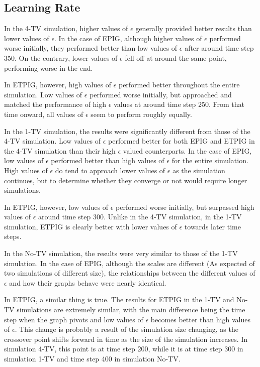 \documentclass[12pt]{thesis}
\begin{document}
\subsection{Learning Rate}
In the 4-TV simulation, higher values of $\epsilon$ generally provided better results than lower values of $\epsilon$. In the case of EPIG, although higher values of $\epsilon$ performed worse initially, they performed better than low values of $\epsilon$ after around time step 350. On the contrary, lower values of $\epsilon$ fell off at around the same point, performing worse in the end.

In ETPIG, however, high values of $\epsilon$ performed better throughout the entire simulation. Low values of $\epsilon$ performed worse initially, but approached and matched the performance of high $\epsilon$ values at around time step 250. From that time onward, all values of $\epsilon$ seem to perform roughly equally.

In the 1-TV simulation, the results were significantly different from those of the 4-TV simulation. Low values of $\epsilon$ performed better for both EPIG and ETPIG in the 4-TV simulation than their high $\epsilon$ valued counterparts. In the case of EPIG, low values of $\epsilon$ performed better than high values of $\epsilon$ for the entire simulation. High values of $\epsilon$ do tend to approach lower values of $\epsilon$ as the simulation continues, but to determine whether they converge or not would require longer simulations.

In ETPIG, however, low values of $\epsilon$ performed worse initially, but surpassed high values of $\epsilon$ around time step 300. Unlike in the 4-TV simulation, in the 1-TV simulation, ETPIG is clearly better with lower values of $\epsilon$ towards later time steps.

In the No-TV simulation, the results were very similar to those of the 1-TV simulation. In the case of EPIG, although the scales are different (As expected of two simulations of different size), the relationships between the different values of $\epsilon$ and how their graphs behave were nearly identical.

In ETPIG, a similar thing is true. The results for ETPIG in the 1-TV and No-TV simulations are extremely similar, with the main difference being the time step when the graph pivots and low values of $\epsilon$ becomes better than high values of $\epsilon$. This change is probably a result of the simulation size changing, as the crossover point shifts forward in time as the size of the simulation increases. In simulation 4-TV, this point is at time step 200, while it is at time step 300 in simulation 1-TV and time step 400 in simulation No-TV.
\end{document}
